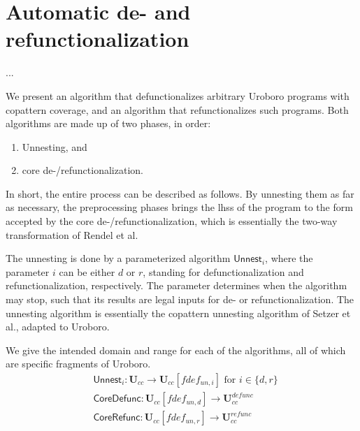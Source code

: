 \chapter{Automatic de- and refunctionalization}


...

We present an algorithm that defunctionalizes arbitrary Uroboro programs with copattern coverage, and an algorithm that refunctionalizes such programs. Both algorithms are made up of two phases, in order:
\begin{enumerate}
\item Unnesting, and
\item core de-/refunctionalization.
\end{enumerate}

In short, the entire process can be described as follows. By unnesting them as far as necessary, the preprocessing phases brings the lhss of the program to the form accepted by the core de-/refunctionalization, which is essentially the two-way transformation of Rendel et al.

The unnesting is done by a parameterized algorithm $\textsf{Unnest}_i$, where the parameter $i$ can be either $d$ or $r$, standing for defunctionalization and refunctionalization, respectively. The parameter determines when the algorithm may stop, such that its results are legal inputs for de- or refunctionalization. The unnesting algorithm is essentially the copattern unnesting algorithm of Setzer et al., adapted to Uroboro.

We give the intended domain and range for each of the algorithms, all of which are specific fragments of Uroboro.
\begin{align*}
& \textsf{Unnest}_i: \mathbf{U}_{cc} \to \mathbf{U}_{cc}[fdef_{un,i}] \text{ for } i \in \{d,r\} \\
& \textsf{CoreDefunc}: \mathbf{U}_{cc}[fdef_{un,d}] \to \mathbf{U}^{defunc}_{cc} \\
& \textsf{CoreRefunc}: \mathbf{U}_{cc}[fdef_{un,r}] \to \mathbf{U}^{refunc}_{cc}
\end{align*}

